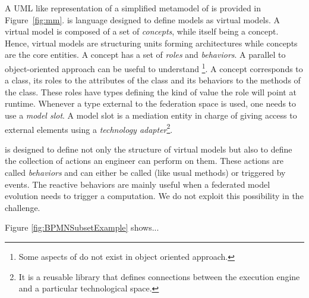 A UML like representation of a simplified metamodel of \FML is provided in Figure~\ref{fig:mm}. \FML is language designed to define models as virtual models. A virtual model
is composed of a set of \emph{concepts}, while itself being a concept.
Hence, virtual models are structuring units forming architectures while concepts are the
core entities. A concept has a set of \emph{roles} and
\emph{behaviors}. A parallel to object-oriented approach can be useful
to understand \FML\footnote{Some aspects of \FML do not exist in object oriented approach.}. A concept corresponds to a class, its roles to the
attributes of the class and its behaviors to the methods of the class.
These roles have types defining the kind of value the role will point
at runtime.
Whenever a type external to the federation space is used, one needs to use a \emph{model slot}. A model
slot is a mediation entity in charge of giving
access to external elements using
a \emph{technology adapter}\footnote{It is a reusable library that defines
connections between the \FML execution engine and a particular
technological space.}.



\FML is designed to define not only the structure of virtual models but
also to define the collection of actions an engineer can perform on
them. These actions are called \emph{behaviors} and can either be called (like usual methods) or triggered by events. The reactive behaviors are mainly useful when a federated model evolution needs to trigger a computation. We do not
exploit this possibility in the challenge.



Figure \ref{fig:BPMNSubsetExample} shows...



